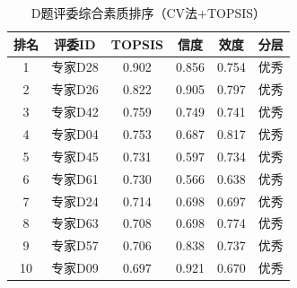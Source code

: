 \begin{table}[h]
\centering
\caption{D题评委综合素质排序（CV法+TOPSIS）}
\begin{tabular}{cccccc}
\hline
排名 & 评委ID & TOPSIS & 信度 & 效度 & 分层 \\
\hline
1 & 专家D28 & 0.902 & 0.856 & 0.754 & 优秀 \\
2 & 专家D26 & 0.822 & 0.905 & 0.797 & 优秀 \\
3 & 专家D42 & 0.759 & 0.749 & 0.741 & 优秀 \\
4 & 专家D04 & 0.753 & 0.687 & 0.817 & 优秀 \\
5 & 专家D45 & 0.731 & 0.597 & 0.734 & 优秀 \\
6 & 专家D61 & 0.730 & 0.566 & 0.638 & 优秀 \\
7 & 专家D24 & 0.714 & 0.698 & 0.697 & 优秀 \\
8 & 专家D63 & 0.708 & 0.698 & 0.774 & 优秀 \\
9 & 专家D57 & 0.706 & 0.838 & 0.737 & 优秀 \\
10 & 专家D09 & 0.697 & 0.921 & 0.670 & 优秀 \\
\hline
\end{tabular}
\end{table}
